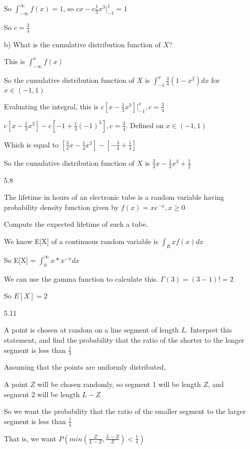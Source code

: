 \documentclass[11pt]{article}
\begin{document}
\begin{itemize}
  So $\int_{-\infty}^{\infty} f(x) = 1$, so $cx - c\frac{1}{3}x^3 |_{-1}^{1} = 1$

  So $c = \frac{3}{4}$

  b) What is the cumulative distribution function of $X$?

  This is $\int_{-\infty}^{x} f(x)$

  So the cumulative distribution function of $X$ is $\int_{-1}^{x} \frac{3}{4} (1-x^2) dx$ for $x \in (-1, 1)$

  Evaluating the integral, this is $c[x - \frac{1}{3}x^3] |_{-1}^{x}, c = \frac{3}{4}$

  $c[x - \frac{1}{3}x^3] - c[-1 + \frac{1}{3}(-1)^3], c = \frac{3}{4}$. Defined on $x \in (-1, 1) $

  Which is equal to $[\frac{3}{4}x - \frac{1}{4}x^3] - [-\frac{3}{4} + \frac{1}{4}]$

  So the cumulative distribution function of $X$ is $\frac{3}{4}x - \frac{1}{4}x^3 + \frac{1}{2}$

  \item[5.8]

    The lifetime in hours of an electronic tube is a random variable having probability density function given by $f(x) = xe^{-x}, x \geq 0$

    Compute the expected lifetime of such a tube.

    We know E[X] of a continuous random variable is $\int_{R} xf(x) dx$

    So E[X] = $\int_0^{\infty} x*x^{-x} dx$

    We can use the gamma function to calculate this. $\Gamma(3) = (3-1)! = 2$

    So $E[X] = 2$

  \item[5.11]

   A point is chosen at random on a line segment of length $L$. Interpret this statement, and find the probability that the ratio of the shorter to the longer segment is less than $\frac{1}{4}$

   Assuming that the points are uniformly distributed,

   A point $Z$ will be chosen randomly, so segment 1 will be length $Z$, and segment 2 will be length $L - Z$

   So we want the probability that the ratio of the smaller segment to the larger segment is less than $\frac{1}{4}$

   That is, we want $P( min(\frac{Z}{L-Z}, \frac{L-Z}{Z}) < \frac{1}{4})$


\end{itemize}
\end{document}
